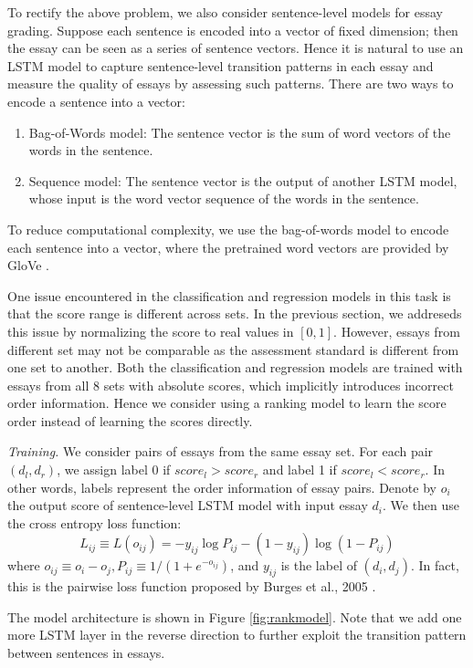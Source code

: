 \documentclass[10pt,psamsfonts]{amsart}
\theoremstyle{definition}
\theoremstyle{remark}
\numberwithin{equation}{section}
\begin{document}
To rectify the above problem, we also consider sentence-level models for essay grading. Suppose each sentence is encoded into a vector of fixed dimension; then the essay can be seen as a series of sentence vectors. Hence it is natural to use an LSTM model to capture sentence-level transition patterns in each essay and measure the quality of essays by assessing such patterns. There are two ways to encode a sentence into a vector:
\begin{enumerate}
\item Bag-of-Words model: The sentence vector is the sum of word vectors of the words in the sentence.
\item Sequence model: The sentence vector is the output of another LSTM model, whose input is the word vector sequence of the words in the sentence. 
\end{enumerate}
To reduce computational complexity, we use the bag-of-words model to encode each sentence into a vector, where the pretrained word vectors are provided by GloVe \cite{glove}.

One issue encountered in the classification and regression models in this task is that the score range is different across sets. In the previous section, we addreseds this issue by normalizing the score to real values in $[0, 1]$. However, essays from different set may not be comparable as the assessment standard is different from one set to another. Both the classification and regression models are trained with essays from all 8 sets with absolute scores, which implicitly introduces incorrect order information. Hence we consider using a ranking model to learn the score order instead of learning the scores directly. 

{\em Training.} We consider pairs of essays from the same essay set. For each pair $(d_l, d_r)$, we assign label 0 if $score_l>score_r$ and label 1 if $score_l<score_r$. In other words, labels represent the order information of essay pairs. Denote by $o_i$ the output score of sentence-level LSTM model with input essay $d_i$. We then use the cross entropy loss function:
$$L_{ij}\equiv L(o_{ij})=-y_{ij}\log P_{ij}-(1-y_{ij})\log(1-P_{ij})$$ 
where $o_{ij}\equiv o_i-o_j, P_{ij}\equiv 1/(1+e^{-o_{ij}})$, and $y_{ij}$ is the label of $(d_i, d_j)$. In fact, this is the pairwise loss function proposed by Burges et al., 2005 \cite{ranknet}.

The model architecture is shown in Figure \ref{fig:rankmodel}. Note that we add one more LSTM layer in the reverse direction to further exploit the transition pattern between sentences in essays.
\end{document}
